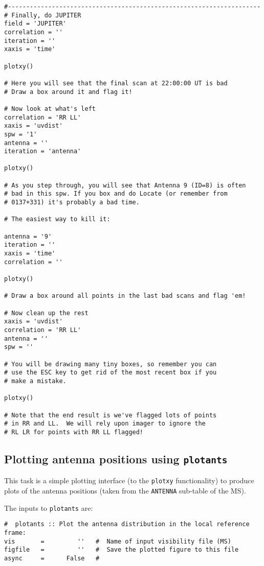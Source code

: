 \begin{verbatim}
#---------------------------------------------------------------------
# Finally, do JUPITER
field = 'JUPITER'
correlation = ''
iteration = ''
xaxis = 'time'

plotxy()

# Here you will see that the final scan at 22:00:00 UT is bad
# Draw a box around it and flag it!

# Now look at what's left
correlation = 'RR LL'
xaxis = 'uvdist'
spw = '1'
antenna = ''
iteration = 'antenna'

plotxy()

# As you step through, you will see that Antenna 9 (ID=8) is often 
# bad in this spw. If you box and do Locate (or remember from
# 0137+331) it's probably a bad time.

# The easiest way to kill it:

antenna = '9'
iteration = ''
xaxis = 'time'
correlation = ''

plotxy()

# Draw a box around all points in the last bad scans and flag 'em!

# Now clean up the rest
xaxis = 'uvdist'
correlation = 'RR LL'
antenna = ''
spw = ''

# You will be drawing many tiny boxes, so remember you can
# use the ESC key to get rid of the most recent box if you
# make a mistake.

plotxy()

# Note that the end result is we've flagged lots of points
# in RR and LL.  We will rely upon imager to ignore the
# RL LR for points with RR LL flagged!

\end{verbatim}
\normalsize

\subsection{Plotting antenna positions using {\tt plotants}}
\label{section:edit.plot.plotants}

This task is a simple plotting interface (to the {\tt plotxy}
functionality) to produce plots of the antenna positions (taken from
the {\tt ANTENNA} sub-table of the MS).

The inputs to {\tt plotants} are:
\small
\begin{verbatim}
#  plotants :: Plot the antenna distribution in the local reference frame:
vis       =         ''   #  Name of input visibility file (MS)
figfile   =         ''   #  Save the plotted figure to this file
async     =      False   #  
\end{verbatim}
\normalsize



